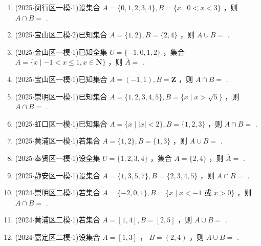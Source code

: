 \begin{enumerate}
    \item (2025$\cdot$闵行区一模$\cdot$1)设集合 $A = \{ 0,1,2,3,4\} ,B = \{ x \mid  0 < x < 3\}$ ，则 $A \cap  B =$ .

    \item (2025$\cdot$宝山区二模$\cdot$2)已知集合 $A = \{ 1,2\} ,B = \{ 2,4\}$ ，则 $A \cup  B =$ .

    \item (2025$\cdot$金山区一模$\cdot$1)已知全集 $U = \{  - 1,0,1,2\}$ ，集合 $A = \{ x \mid   - 1 < x \leq  1,x \in  \mathbf{N}\}$ ，则 $\overline{A} =$ .

    \item (2025$\cdot$宝山区一模$\cdot$1)已知集合 $A = \left( {-1,1}\right) ,B = \mathbf{Z}$ ，则 $A \cap  B =$ .

    \item (2025$\cdot$崇明区一模$\cdot$1)已知集合 $A = \{ 1,2,3,4,5\} ,B = \{ x \mid  x > \sqrt{5}\}$ ，则 $A \cap  B =$ .

    \item (2025$\cdot$虹口区一模$\cdot$1)已知集合 $A = \{ x \mid  \left| x\right|  < 2\} ,B = \{ 1,2,3\}$ ，则 $A \cap  B =$ .

    \item (2025$\cdot$黄浦区一模$\cdot$1)若集合 $A = \{ 1,2\} ,B = \{ 1,3\}$ ，则 $A \cup  B =$ .

    \item (2025$\cdot$奉贤区一模$\cdot$1)设全集 $U = \{ 1,2,3,4\}$ ，集合 $A = \{ 2,4\}$ ，则 $\overline{A} =$ .

    \item (2025$\cdot$静安区一模$\cdot$1)设集合 $A = \{ 1,3,5,7\} ,B = \{ 2,3,4,5\}$ ，则 $A \cap  B =$ .

    \item (2024$\cdot$崇明区二模$\cdot$1)若集合 $A = \{  - 2,0,1\} ,B = \{ x \mid  x <  - 1$ 或 $x > 0\}$ ，则 $A \cap  B =$ .

    \item (2024$\cdot$黄浦区二模$\cdot$1)若集合 $A = \left\lbrack  {1,4}\right\rbrack  ,B = \left\lbrack  {2,5}\right\rbrack$ ，则 $A \cup  B =$ .

    \item (2024$\cdot$嘉定区二模$\cdot$1)设集合 $A = \left\lbrack  {1,3}\right\rbrack$ ， $B = \left( {2,4}\right)$ ，则 $A \cup  B =$ .


\end{enumerate}
